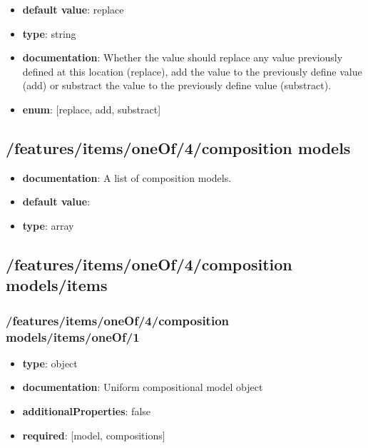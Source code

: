 \begin{itemize}\item {\bf default value}: replace
\item {\bf type}: string
\item {\bf documentation}: Whether the value should replace any value previously defined at this location (replace), add the value to the previously define value (add) or substract the value to the previously define value (substract).
\item {\bf enum}: [replace, add, substract]\end{itemize}\subsection{/features/items/oneOf/4/composition models}
\begin{itemize}\item {\bf documentation}: A list of composition models.
\item {\bf default value}: 
\item {\bf type}: array
\end{itemize}\subsection{/features/items/oneOf/4/composition models/items}

\subsubsection{/features/items/oneOf/4/composition models/items/oneOf/1}
\begin{itemize}\item {\bf type}: object
\item {\bf documentation}: Uniform compositional model object
\item {\bf additionalProperties}: false
\item {\bf required}: [model, compositions]\end{itemize}
